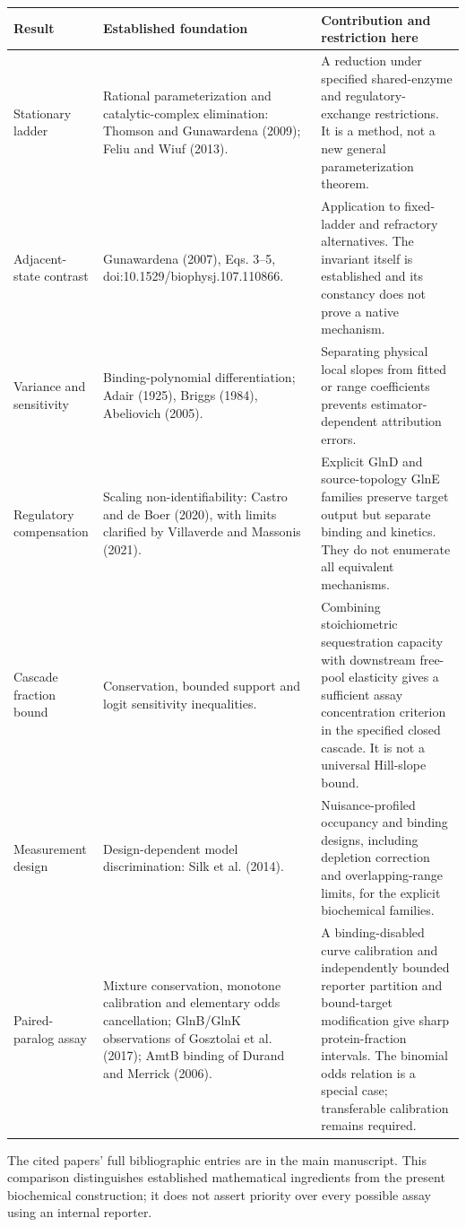 \documentclass[11pt]{article}
\begin{document}
\begin{center}\small
\begin{tabular}{>{\raggedright\arraybackslash}p{}>{\raggedright\arraybackslash}p{}>{\raggedright\arraybackslash}p{}}
\toprule
Result & Established foundation & Contribution and restriction here\\\midrule
Stationary ladder & Rational parameterization and catalytic-complex elimination: Thomson and Gunawardena (2009); Feliu and Wiuf (2013). & A reduction under specified shared-enzyme and regulatory-exchange restrictions. It is a method, not a new general parameterization theorem.\\[0.7em]
Adjacent-state contrast & Gunawardena (2007), Eqs. 3--5, doi:10.1529/biophysj.107.110866. & Application to fixed-ladder and refractory alternatives. The invariant itself is established and its constancy does not prove a native mechanism.\\[0.7em]
Variance and sensitivity & Binding-polynomial differentiation; Adair (1925), Briggs (1984), Abeliovich (2005). & Separating physical local slopes from fitted or range coefficients prevents estimator-dependent attribution errors.\\[0.7em]
Regulatory compensation & Scaling non-identifiability: Castro and de Boer (2020), with limits clarified by Villaverde and Massonis (2021). & Explicit GlnD and source-topology GlnE families preserve target output but separate binding and kinetics. They do not enumerate all equivalent mechanisms.\\[0.7em]
Cascade fraction bound & Conservation, bounded support and logit sensitivity inequalities. & Combining stoichiometric sequestration capacity with downstream free-pool elasticity gives a sufficient assay concentration criterion in the specified closed cascade. It is not a universal Hill-slope bound.\\[0.7em]
Measurement design & Design-dependent model discrimination: Silk et al. (2014). & Nuisance-profiled occupancy and binding designs, including depletion correction and overlapping-range limits, for the explicit biochemical families.\\[0.7em]
Paired-paralog assay & Mixture conservation, monotone calibration and elementary odds cancellation; GlnB/GlnK observations of Gosztolai et al. (2017); AmtB binding of Durand and Merrick (2006). & A binding-disabled curve calibration and independently bounded reporter partition and bound-target modification give sharp protein-fraction intervals. The binomial odds relation is a special case; transferable calibration remains required.\\
\bottomrule
\end{tabular}
\end{center}

The cited papers' full bibliographic entries are in the main manuscript. This comparison distinguishes established mathematical ingredients from the present biochemical construction; it does not assert priority over every possible assay using an internal reporter.
\end{document}
